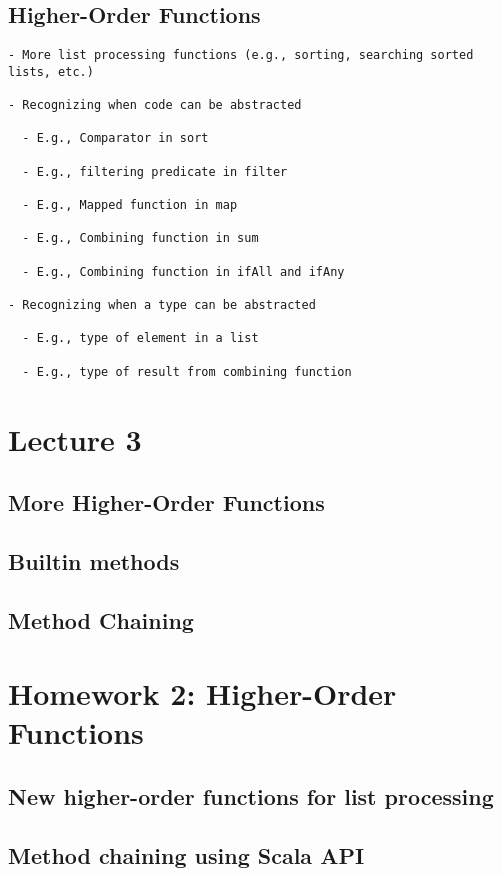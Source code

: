 \documentclass{book}
\begin{document}
\section{Higher-Order Functions}

\begin{verbatim}
- More list processing functions (e.g., sorting, searching sorted lists, etc.)

- Recognizing when code can be abstracted

  - E.g., Comparator in sort

  - E.g., filtering predicate in filter

  - E.g., Mapped function in map

  - E.g., Combining function in sum

  - E.g., Combining function in ifAll and ifAny

- Recognizing when a type can be abstracted

  - E.g., type of element in a list

  - E.g., type of result from combining function
\end{verbatim}

\chapter{Lecture 3}

\section{More Higher-Order Functions}

\section{Builtin methods}

\section{Method Chaining}

\chapter{Homework 2: Higher-Order Functions}

\section{New higher-order functions for list processing}
\section{Method chaining using Scala API}
\end{document}
